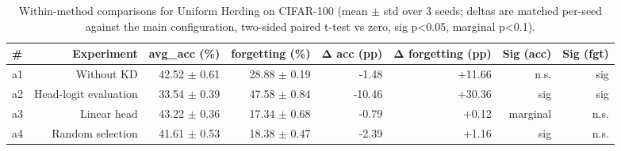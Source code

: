 \documentclass{article}
\begin{document}
\begin{table}[htbp]
  \centering
  \caption{Within-method comparisons for Uniform Herding on CIFAR-100 (mean $\pm$ std over 3 seeds; deltas are matched per-seed against the main configuration, two-sided paired t-test vs zero, sig p<0.05, marginal p<0.1).}
  \label{tab:T2_component_ablations}
  \begin{tabular}{lrrrrrrr}
    \toprule
    \textbf{\#} & \textbf{Experiment} & \textbf{avg\_acc (\%)} & \textbf{forgetting (\%)} & \textbf{Δ acc (pp)} & \textbf{Δ forgetting (pp)} & \textbf{Sig (acc)} & \textbf{Sig (fgt)} \\
    \midrule
    a1 & Without KD & 42.52 $\pm$ 0.61 & 28.88 $\pm$ 0.19 & -1.48 & +11.66 & n.s. & sig \\
    a2 & Head-logit evaluation & 33.54 $\pm$ 0.39 & 47.58 $\pm$ 0.84 & -10.46 & +30.36 & sig & sig \\
    a3 & Linear head & 43.22 $\pm$ 0.36 & 17.34 $\pm$ 0.68 & -0.79 & +0.12 & marginal & n.s. \\
    a4 & Random selection & 41.61 $\pm$ 0.53 & 18.38 $\pm$ 0.47 & -2.39 & +1.16 & sig & n.s. \\
    \bottomrule
  \end{tabular}
\end{table}
\end{document}
